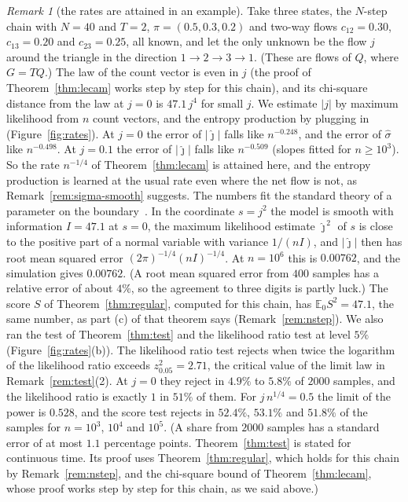 \documentclass[11pt]{article}
\theoremstyle{definition}
\theoremstyle{remark}
\newtheorem{remark}[theorem]{Remark}
\newcommand{\E}{\mathbb E}
\begin{document}
\begin{remark}[the rates are attained in an example]\label{rem:rates}
Take three states, the $N$-step chain with $N=40$ and $T=2$,
$\pi=(0.5,0.3,0.2)$ and two-way flows $c_{12}=0.30$, $c_{13}=0.20$ and
$c_{23}=0.25$, all known, and
let the only unknown be the flow $j$ around the triangle in the direction
$1\to2\to3\to1$. (These are flows of $Q$, where $G=TQ$.) The law of the count
vector is even in $j$ (the proof of Theorem~\ref{thm:lecam} works step by step
for this chain), and its chi-square distance from the law at $j=0$ is
$47.1\,j^4$ for small $j$. We estimate $\lvert j\rvert$ by maximum
likelihood from $n$ count vectors, and the entropy production by plugging in
(Figure~\ref{fig:rates}). At $j=0$ the error of $\lvert\hat\jmath\rvert$ falls
like $n^{-0.248}$, and the error of $\hat\sigma$ like $n^{-0.498}$. At $j=0.1$
the error of $\lvert\hat\jmath\rvert$ falls like $n^{-0.509}$ (slopes fitted
for $n\ge10^3$). So the rate $n^{-1/4}$ of Theorem~\ref{thm:lecam} is attained
here, and the entropy production is
learned at the usual rate even where the net flow is not, as
Remark~\ref{rem:sigma-smooth} suggests. The numbers fit the standard theory of
a parameter on the boundary~\cite{sl1987}. In the coordinate $s=j^2$ the model
is smooth with information $I=47.1$ at $s=0$, the maximum likelihood estimate
$\hat\jmath^{\,2}$ of $s$ is close to
the positive part of a normal variable with variance $1/(nI)$, and
$\lvert\hat\jmath\rvert$ then has root mean squared error
$(2\pi)^{-1/4}(nI)^{-1/4}$. At $n=10^6$ this is $0.00762$, and the simulation
gives $0.00762$. (A root mean squared error from $400$ samples has a relative
error of about $4\%$, so the agreement to three digits is partly luck.) The
score $S$ of Theorem~\ref{thm:regular}, computed for this
chain, has $\E_0S^2=47.1$, the same number, as part (c) of that theorem says
(Remark~\ref{rem:nstep}).
We also ran the test of Theorem~\ref{thm:test} and the likelihood ratio test
at level $5\%$ (Figure~\ref{fig:rates}(b)). The likelihood ratio test rejects
when twice the logarithm of the likelihood ratio exceeds $z_{0.05}^2=2.71$, the
critical value of the limit law in Remark~\ref{rem:test}(2). At $j=0$ they reject in $4.9\%$ to
$5.8\%$ of $2000$ samples, and the likelihood ratio is exactly $1$ in $51\%$
of them. For $j\,n^{1/4}=0.5$ the limit of the power is $0.528$, and the
score test rejects in $52.4\%$, $53.1\%$ and $51.8\%$ of the samples for
$n=10^3$, $10^4$ and $10^5$. (A share from $2000$ samples has a standard
error of at most $1.1$ percentage points. Theorem~\ref{thm:test} is stated for
continuous time. Its proof uses Theorem~\ref{thm:regular}, which holds for
this chain by Remark~\ref{rem:nstep}, and the chi-square bound of
Theorem~\ref{thm:lecam}, whose proof works step by step for this chain, as
we said above.)
\end{remark}
\end{document}

